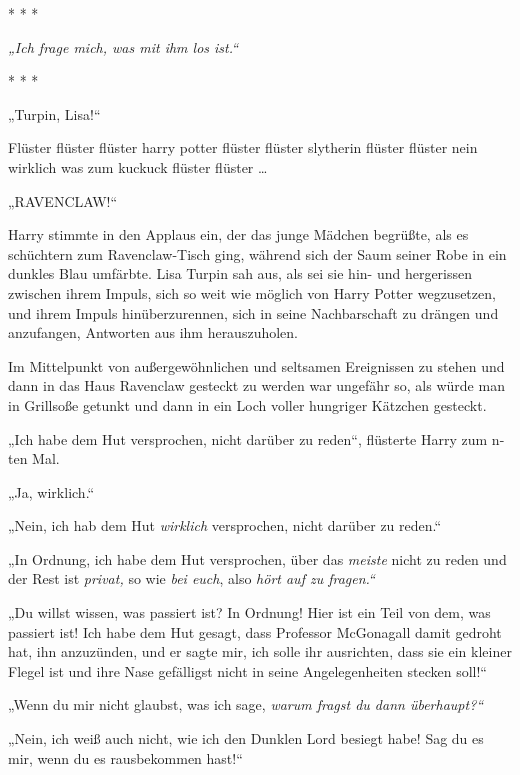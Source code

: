 

\hypertarget{selbstbeherrschung}{%

* * *

\emph{„Ich frage mich, was mit ihm los ist.“}

* * *

„Turpin, Lisa!“

Flüster flüster flüster harry potter flüster flüster slytherin flüster flüster nein wirklich was zum kuckuck flüster flüster …

„RAVENCLAW!“

Harry stimmte in den Applaus ein, der das junge Mädchen begrüßte, als es schüchtern zum Ravenclaw-Tisch ging, während sich der Saum seiner Robe in ein dunkles Blau umfärbte. Lisa Turpin sah aus, als sei sie hin- und hergerissen zwischen ihrem Impuls, sich so weit wie möglich von Harry Potter wegzusetzen, und ihrem Impuls hinüberzurennen, sich in seine Nachbarschaft zu drängen und anzufangen, Antworten aus ihm herauszuholen.

Im Mittelpunkt von außergewöhnlichen und seltsamen Ereignissen zu stehen und dann in das Haus Ravenclaw gesteckt zu werden war ungefähr so, als würde man in Grillsoße getunkt und dann in ein Loch voller hungriger Kätzchen gesteckt.

„Ich habe dem Hut versprochen, nicht darüber zu reden“, flüsterte Harry zum n-ten Mal.

„Ja, wirklich.“

„Nein, ich hab dem Hut \emph{wirklich} versprochen, nicht darüber zu reden.“

„In Ordnung, ich habe dem Hut versprochen, über das \emph{meiste} nicht zu reden und der Rest ist \emph{privat,} so wie \emph{bei euch}, also \emph{hört auf zu fragen.“}

„Du willst wissen, was passiert ist? In Ordnung! Hier ist ein Teil von dem, was passiert ist! Ich habe dem Hut gesagt, dass Professor McGonagall damit gedroht hat, ihn anzuzünden, und er sagte mir, ich solle ihr ausrichten, dass sie ein kleiner Flegel ist und ihre Nase gefälligst nicht in seine Angelegenheiten stecken soll!“

„Wenn du mir nicht glaubst, was ich sage, \emph{warum fragst du dann überhaupt?“}

„Nein, ich weiß auch nicht, wie ich den Dunklen Lord besiegt habe! Sag du es mir, wenn du es rausbekommen hast!“

}

